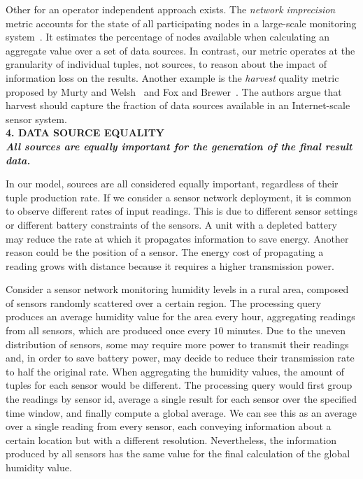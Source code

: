 Other \DIFdelbegin {}\DIFdelend \DIFaddbegin {}\DIFaddend for an operator independent approach exists. The \textit{network imprecision}  metric
accounts for the state of all participating nodes in a large-scale monitoring
system~\cite{network-imprecision}.
It estimates the percentage of nodes available when calculating an aggregate value over a set of data
sources. In contrast, our metric operates at the granularity of individual tuples, not sources, to reason
about the impact of information loss on the results.
Another example is the \textit{harvest} quality metric proposed by Murty and
Welsh~\cite{dependable-is-sensing} and Fox and Brewer~\cite{Fox1999}. The authors argue that harvest
should capture the fraction of data sources available in an Internet-scale sensor system. \\

\textbf{4. DATA SOURCE EQUALITY \\ \textit{All sources are equally important for the generation of the
final result data.}}

In our model, sources are all considered equally important, regardless of their tuple production rate.
If we consider a sensor network deployment, it is common to observe different rates of input readings.
This is due to different sensor settings or different battery constraints of the sensors. A unit with a
depleted battery may reduce the rate at which it propagates information to save energy.
Another reason could be the position of a sensor. The energy cost of propagating a reading grows with
distance because it requires a higher transmission power.

	Consider a sensor network monitoring humidity levels in a rural area, composed of sensors randomly
	scattered over a certain region. The processing query produces an average humidity value for the area
	every hour, aggregating readings from all sensors, which are produced once every $10$
	minutes. Due to the uneven distribution of sensors, some may require more power to transmit their
	readings and, in order to save battery power, may decide to reduce their transmission rate to half the original rate. 
	When aggregating the humidity values, the amount of tuples for each sensor would be different. The
	processing query would first group the readings by sensor id, average a single result for each sensor
	over the specified time window, and finally compute a global average. We can see this as an average
	over a single reading from every sensor, each conveying information about a certain location but with
	a different resolution. Nevertheless, the information produced by all sensors has the same value for the
	final calculation of the global humidity value.

